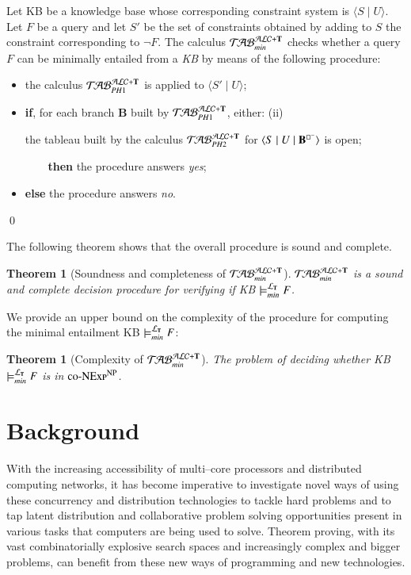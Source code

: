 \documentclass[a4paper, 11pt, oneside]{elsarticle}
\newcommand{\tip}{{\bf T}}
\newcommand{\nott} {\lnot}
\newcommand{\tc} {\mid}
\newcommand{\bbox}{\square}
\newcommand{\sx} {\langle}
\newcommand{\dx} {\rangle}
\newcommand{\ellet} {\mathcal{L}_{\bf T}}
\newcommand{\nuovoc}{\mathrel{{\mathcal{T}\!\mathcal{AB}}}_{min}^{\mathcal{ALC}+\mbox{\scriptsize $\tip$}}}
\newcommand{\primo}{\mathrel{{\mathcal{T}\!\mathcal{AB}}}_{PH 1}^{\mathcal{ALC}+\mbox{\scriptsize $\tip$}}}
\newcommand{\secondo}{\mathrel{{\mathcal{T}\!\mathcal{AB}}}_{PH 2}^{\mathcal{ALC}+\mbox{\scriptsize $\tip$}}}
\newenvironment{definition}
{\begin{defi} \rm}{\qed \end{defi}}
\newtheorem{theorem}{Theorem}
\newcounter{posu}
\newtheorem{theorem}[posu]{Theorem}
\newtheorem{definition}[posu]{Definition}
\begin{document}
\begin{definition}\label{def processo}
Let KB be a knowledge base whose corresponding constraint system is $\sx S \tc U \dx$. Let $F$ be a query and let $S'$ be the set of constraints obtained by adding to $S$ the constraint corresponding to $\nott F$.
The calculus $\nuovoc$ checks whether a query $F$ can be minimally entailed from a \emph{KB} by means of the following procedure:
\begin{itemize}
\item the calculus $\primo$ is applied to $\sx S' \tc U \dx$;
\item \textbf{if}, for each branch {\bf B} built by $\primo$, either:
	\subitem(ii) {the tableau built by the calculus $\secondo$ for $\sx S \tc U \tc {\bf
B}^{\bbox^{-}} \dx$ is open;

\verb$    $\textbf{then} the procedure answers \emph{yes};}
\item[] \textbf{else} the procedure answers \emph{no}.
\end{itemize}
\end{definition}

\noindent The following theorem shows that the overall procedure is sound and complete.

\begin{theorem}[Soundness and completeness of $\nuovoc$]\label{Soundness e completeness nuovoc} $\nuovoc$ is  a sound and complete decision procedure for verifying if KB $\models_{min}^{\ellet} F$.
\end{theorem}

We provide an upper bound on the complexity of the procedure for computing the minimal entailment KB $\models_{min}^{\ellet} F$:

\begin{theorem}[Complexity of $\nuovoc$]\label{overall_complexity}
The problem of deciding whether \emph{KB} $\models_{min}^{\ellet} F$ is in $\textsc{co-NExp}^\textsc{NP}$.
\end{theorem}


\newpage

\section{Background}\label{bg}
With the increasing accessibility of multi--core processors and distributed computing networks, it has become imperative to investigate novel ways of using these concurrency and distribution technologies to tackle hard problems and to tap latent distribution and collaborative problem solving opportunities present in various tasks that computers are being used to solve.
Theorem proving, with its vast combinatorially explosive search spaces and increasingly complex and bigger problems, can benefit from these new ways of programming and new technologies\cite{conf/ieeehpcs/SripriyaBS09}.
\end{document}
